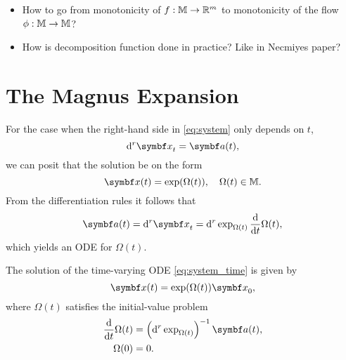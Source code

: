 \begin{itemize}
  \item How to go from monotonicity of $f : \mathbb{M} \rightarrow \mathbb{R}^m$ to monotonicity of the flow $\phi : \mathbb{M} \rightarrow \mathbb{M}$?
  \item How is decomposition function done in practice? Like in Necmiyes paper?
\end{itemize}

\section{The Magnus Expansion}

For the case when the right-hand side in \eqref{eq:system} only depends on $t$,
\begin{equation}
  \label{eq:system_time}
  \mathrm{d}^r \x_t = \a(t),
\end{equation}
we can posit that the solution be on the form
\begin{equation}
  \x(t) = \exp (\Omega(t)), \quad \Omega(t) \in \M.
\end{equation}
From the differentiation rules it follows that
\begin{equation}
  \a(t) = \mathrm{d}^r \x_t = \mathrm{d}^r \exp_{\Omega(t)} \frac{\mathrm{d}}{\mathrm{d}t}\Omega(t),
\end{equation}
which yields an ODE for $\Omega(t)$.
\begin{important}
  \begin{theorem}
    \label{thm:magnus_solution}
    The solution of the time-varying ODE \eqref{eq:system_time} is given by
    \begin{equation}
      \x(t) = \exp(\Omega(t)) \x_0,
    \end{equation}
    where $\Omega(t)$ satisfies the initial-value problem
    \begin{equation}
      \label{eq:magnus_omega_ode}
      \begin{aligned}
        \frac{\mathrm{d}}{\mathrm{d}t} \Omega(t) &= \left(\mathrm{d}^r \exp_{\Omega(t)}\right)^{-1} \a(t), \\
        \Omega(0) &= 0.
      \end{aligned}
    \end{equation}
  \end{theorem}
\end{important}

